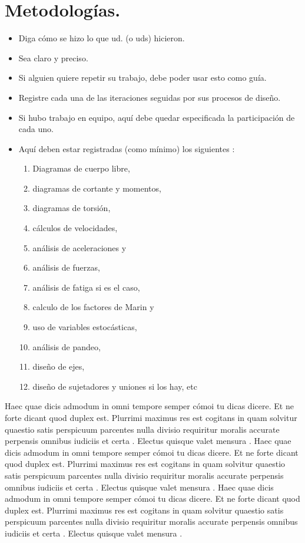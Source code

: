 \documentclass[10pt]{article}
\begin{document}
\section{Metodologías.}



\begin{itemize}
\item Diga cómo se hizo lo que ud. (o uds) hicieron.
\item  Sea claro y preciso.
\item  Si alguien quiere repetir su trabajo, debe poder usar esto como guía.
\item  Registre cada una de las iteraciones seguidas por sus procesos de diseño.
\item  Si hubo trabajo en equipo, aquí debe quedar especificada la participación de cada uno.

\item Aquí deben estar registradas (como mínimo) los siguientes :
\begin{enumerate}
\item  Diagramas de cuerpo libre,
\item  diagramas de cortante y momentos,
\item  diagramas de torsión,
\item  cálculos de velocidades,
\item  análisis de aceleraciones y
\item  análisis de fuerzas,
\item  análisis de fatiga si es el caso,
\item  calculo de los factores de Marin y
\item  uso de variables estocásticas,
\item análisis de pandeo,
\item  diseño de ejes,
\item  diseño de sujetadores y uniones si los hay, etc
\end{enumerate}



\end{itemize}
Haec quae dicis admodum in omni tempore semper cómoi tu dicas dicere. Et ne forte dicant quod duplex est. Plurrimi maximus res est cogitans in quam solvitur quaestio satis perspicuum parcentes nulla divisio requiritur moralis accurate perpensis omnibus iudiciis et certa . Electus quisque valet mensura .
Haec quae dicis admodum in omni tempore semper cómoi tu dicas dicere. Et ne forte dicant quod duplex est. Plurrimi maximus res est cogitans in quam solvitur quaestio satis perspicuum parcentes nulla divisio requiritur moralis accurate perpensis omnibus iudiciis et certa . Electus quisque valet mensura .
Haec quae dicis admodum in omni tempore semper cómoi tu dicas dicere. Et ne forte dicant quod duplex est. Plurrimi maximus res est cogitans in quam solvitur quaestio satis perspicuum parcentes nulla divisio requiritur moralis accurate perpensis omnibus iudiciis et certa . Electus quisque valet mensura .
\end{document}
